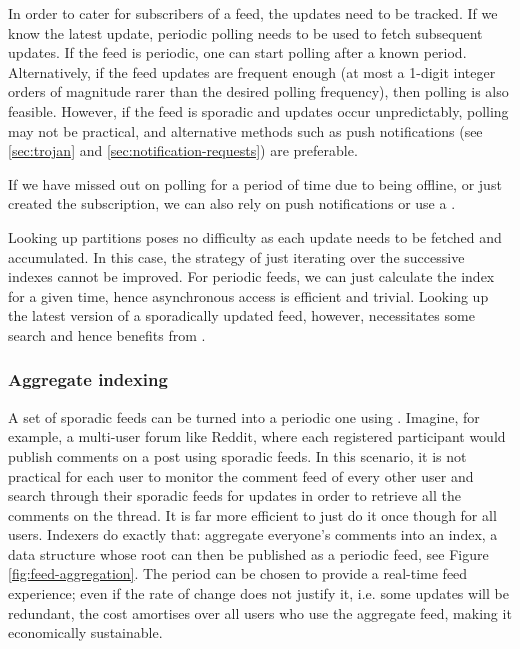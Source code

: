 In order to cater for subscribers of a feed, the updates need to be tracked. If we know the latest update, periodic polling needs to be used to fetch subsequent updates. 
If the feed is periodic, one can start polling after a known period. Alternatively, if the feed updates are frequent enough (at most a 1-digit integer orders of magnitude rarer than the desired polling frequency), then polling is also feasible.
However, if the feed is sporadic and updates occur unpredictably, polling may not be practical, and alternative methods such as push notifications (see \ref{sec:trojan} and \ref{sec:notification-requests}) are preferable.

If we have missed out on polling for a period of time due to being offline, or just created the subscription, we can also rely on push notifications or use a . 

Looking up partitions poses no difficulty as each update needs to be fetched and accumulated. In this case, the strategy of just iterating over the successive indexes cannot be improved.
For periodic feeds, we can just calculate the index for a given time, hence asynchronous access is efficient and trivial. 
Looking up the latest version of a sporadically updated feed, however, necessitates some search and hence benefits from .



\subsubsection{Aggregate indexing}

A set of sporadic feeds can be turned into a periodic one using . Imagine, for example, a multi-user forum like Reddit, where each registered participant would publish comments on a post using sporadic feeds. In this scenario, it is not practical for each user to monitor the comment feed of every other user and search through their sporadic feeds for updates in order to retrieve all the comments on the thread. It is far more efficient to just do it once though for all users. Indexers do exactly that: aggregate everyone's comments into an index, a data structure whose root can then be published as a periodic feed, see Figure \ref{fig:feed-aggregation}. The period can be chosen to provide a real-time feed experience; even if the rate of change does not justify it, i.e. some updates will be redundant, the cost amortises over all users who use the aggregate feed, making it economically sustainable. 

